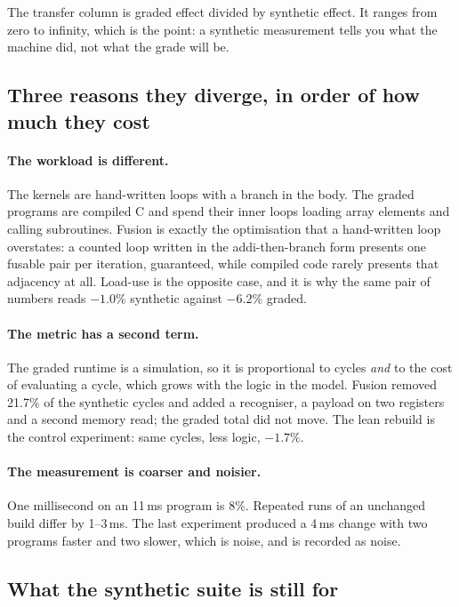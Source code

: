 \documentclass[11pt]{article}
\begin{document}
The transfer column is graded effect divided by synthetic effect. It ranges from zero to
infinity, which is the point: a synthetic measurement tells you what the machine did, not what
the grade will be.

\subsection{Three reasons they diverge, in order of how much they cost}

\paragraph{The workload is different.} The kernels are hand-written loops with a branch in the
body. The graded programs are compiled C and spend their inner loops loading array elements and
calling subroutines. Fusion is exactly the optimisation that a hand-written loop overstates: a
counted loop written in the addi-then-branch form presents one fusable pair per iteration,
guaranteed, while compiled code rarely presents that adjacency at all. Load-use is the opposite
case, and it is why the same pair of numbers reads $-1.0\%$ synthetic against $-6.2\%$ graded.

\paragraph{The metric has a second term.} The graded runtime is a simulation, so it is
proportional to cycles \emph{and} to the cost of evaluating a cycle, which grows with the logic
in the model. Fusion removed 21.7\% of the synthetic cycles and added a recogniser, a payload on
two registers and a second memory read; the graded total did not move. The lean rebuild is the
control experiment: same cycles, less logic, $-1.7\%$.

\paragraph{The measurement is coarser and noisier.} One millisecond on an 11\,ms program is 8\%.
Repeated runs of an unchanged build differ by 1--3\,ms. The last experiment produced a 4\,ms
change with two programs faster and two slower, which is noise, and is recorded as noise.

\subsection{What the synthetic suite is still for}
\end{document}
